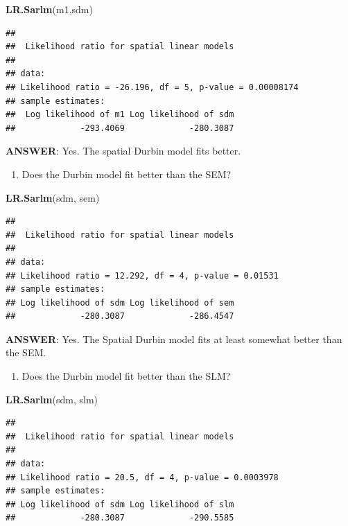 \documentclass[
]{book}
\newenvironment{Shaded}{\begin{snugshade}}{\end{snugshade}}
\newcommand{\FunctionTok}[1]{\textcolor[rgb]{0.13,0.29,0.53}{\textbf{#1}}}
\newcommand{\NormalTok}[1]{#1}
\providecommand{\tightlist}{%
  \setlength{\itemsep}{0pt}\setlength{\parskip}{0pt}}
\begin{document}
\begin{Shaded}
\begin{Highlighting}[]
\FunctionTok{LR.Sarlm}\NormalTok{(m1,sdm)}
\end{Highlighting}
\end{Shaded}

\begin{verbatim}
## 
##  Likelihood ratio for spatial linear models
## 
## data:  
## Likelihood ratio = -26.196, df = 5, p-value = 0.00008174
## sample estimates:
##  Log likelihood of m1 Log likelihood of sdm 
##             -293.4069             -280.3087
\end{verbatim}

\textbf{ANSWER}: Yes. The spatial Durbin model fits better.

\begin{enumerate}
\def\labelenumi{\arabic{enumi}.}
\setcounter{enumi}{1}
\tightlist
\item
  Does the Durbin model fit better than the SEM?
\end{enumerate}

\begin{Shaded}
\begin{Highlighting}[]
\FunctionTok{LR.Sarlm}\NormalTok{(sdm, sem)}
\end{Highlighting}
\end{Shaded}

\begin{verbatim}
## 
##  Likelihood ratio for spatial linear models
## 
## data:  
## Likelihood ratio = 12.292, df = 4, p-value = 0.01531
## sample estimates:
## Log likelihood of sdm Log likelihood of sem 
##             -280.3087             -286.4547
\end{verbatim}

\textbf{ANSWER}: Yes. The Spatial Durbin model fits at least somewhat better than the SEM.

\begin{enumerate}
\def\labelenumi{\arabic{enumi}.}
\setcounter{enumi}{2}
\tightlist
\item
  Does the Durbin model fit better than the SLM?
\end{enumerate}

\begin{Shaded}
\begin{Highlighting}[]
\FunctionTok{LR.Sarlm}\NormalTok{(sdm, slm)}
\end{Highlighting}
\end{Shaded}

\begin{verbatim}
## 
##  Likelihood ratio for spatial linear models
## 
## data:  
## Likelihood ratio = 20.5, df = 4, p-value = 0.0003978
## sample estimates:
## Log likelihood of sdm Log likelihood of slm 
##             -280.3087             -290.5585
\end{verbatim}
\end{document}
